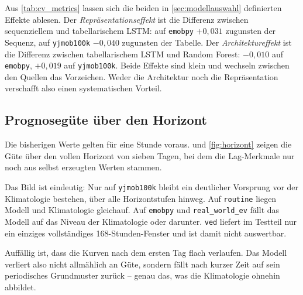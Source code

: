 Aus \cref{tab:cv_metrics} lassen sich die beiden in \cref{sec:modellauswahl}
definierten Effekte ablesen. Der \emph{Repräsentationseffekt} ist die Differenz
zwischen sequenziellem und tabellarischem LSTM: auf \texttt{emobpy} $+0,031$
zugunsten der Sequenz, auf \texttt{yjmob100k} $-0,040$ zugunsten der Tabelle.
Der \emph{Architektureffekt} ist die Differenz zwischen tabellarischem LSTM und
Random Forest: $-0,010$ auf \texttt{emobpy}, $+0,019$ auf \texttt{yjmob100k}.
Beide Effekte sind klein und wechseln zwischen den Quellen das Vorzeichen. Weder
die Architektur noch die Repräsentation verschafft also einen systematischen
Vorteil.

\subsection{Prognosegüte über den Horizont}
\label{sec:horizont}

Die bisherigen Werte gelten für eine Stunde voraus.  und
\cref{fig:horizont} zeigen die Güte über den vollen Horizont von sieben Tagen,
bei dem die Lag-Merkmale nur noch aus selbst erzeugten Werten stammen.

Das Bild ist eindeutig: Nur auf \texttt{yjmob100k} bleibt ein deutlicher
Vorsprung vor der Klimatologie bestehen, über alle Horizontstufen hinweg. Auf
\texttt{routine} liegen Modell und Klimatologie gleichauf. Auf \texttt{emobpy}
und \texttt{real\_world\_ev} fällt das Modell auf das Niveau der Klimatologie
oder darunter. \texttt{ved} liefert im Testteil nur ein einziges vollständiges
168-Stunden-Fenster und ist damit nicht auswertbar.

Auffällig ist, dass die Kurven nach dem ersten Tag flach verlaufen. Das Modell
verliert also nicht allmählich an Güte, sondern fällt nach kurzer Zeit auf sein
periodisches Grundmuster zurück -- genau das, was die Klimatologie ohnehin
abbildet.

